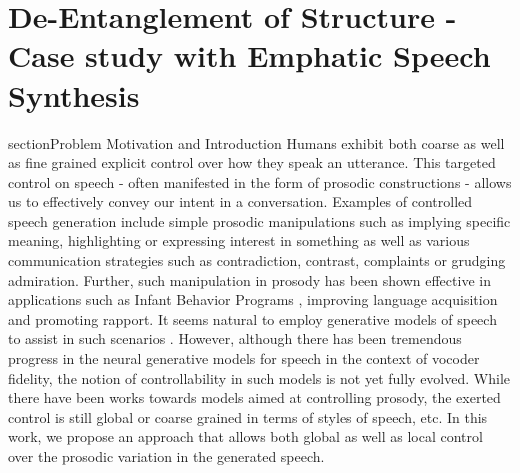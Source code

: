 \chapter{De-Entanglement of Structure - Case study with Emphatic Speech Synthesis}


section{Problem Motivation and Introduction}
Humans exhibit both coarse as well as fine grained explicit control over how they speak an utterance. This targeted control on speech - often manifested in the form of prosodic constructions - allows us to effectively convey our intent in a conversation. Examples of controlled speech generation include simple prosodic manipulations such as implying specific meaning, highlighting or expressing interest in something as well as various communication strategies such as contradiction, contrast, complaints or grudging admiration\citep{nigel_ward_prosodic_patterns}. Further, such manipulation in prosody has been shown effective in
applications such as  Infant Behavior Programs \citep{parental_prosody_changes_mediate_infant_language_production}, improving language acquisition\citep{prosody_functionwords_acquisition} and promoting rapport\citep{rapport_dialogsystems}. It seems natural to employ generative models of speech\citep{tacotron_original,deepvoice2,clarinet,parrotron} to assist in such scenarios \citep{does_tts_help_comprehension}. However, although there has been tremendous progress in the neural generative models for speech in the context of vocoder fidelity\citep{waveglow,wavenet_original}, the notion of controllability in such models is not yet fully evolved. While there have been works towards models aimed at controlling prosody\citep{ tacotron_hierarchical,tacotron_stylefacoruncovering}, the exerted control is still global or coarse grained in terms of styles of speech\citep{tacotron_prosodycontrol,tacotron_styletokens}, etc. In this work, we propose an approach that allows both global as well as local control over the prosodic variation in the generated speech.    

